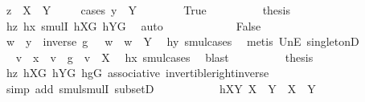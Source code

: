 \begin{isabellebody}
\ {\isachardoublequoteopen}z\ {\isasymin}\ X\ {\isasymcdots}\ Y{\isachardoublequoteclose}\isanewline
\ \ \ \ \isamarkupfalse%
{\isacharparenleft}{\kern0pt}cases\ {\isachardoublequoteopen}y\ {\isasymin}\ Y{\isachardoublequoteclose}{\isacharparenright}{\kern0pt}\isanewline
\ \ \ \ \ \ \isamarkupfalse%
\ True\isanewline
\ \ \ \ \ \ \isamarkupfalse%
\ \isamarkupfalse%
\ {\isacharquery}{\kern0pt}thesis\ \isamarkupfalse%
\ hz\ hx\ smulI\ hXG\ hYG\ \isamarkupfalse%
\ auto\isanewline
\ \ \ \ \isamarkupfalse%
\isanewline
\ \ \ \ \ \ \isamarkupfalse%
\ False\isanewline
\ \ \ \ \ \ \isamarkupfalse%
\ \isamarkupfalse%
\ w\ \ {\isachardoublequoteopen}y\ {\isacharequal}{\kern0pt}\ inverse\ g\ {\isasymcdot}\ \ w{\isachardoublequoteclose}\ \ {\isachardoublequoteopen}w\ {\isasymin}\ Y{\isachardoublequoteclose}\ \isamarkupfalse%
\ hy\ smul{\isachardot}{\kern0pt}cases\ \isamarkupfalse%
\ {\isacharparenleft}{\kern0pt}metis\ UnE\ singletonD{\isacharparenright}{\kern0pt}\isanewline
\ \ \ \ \ \ \isamarkupfalse%
\ \isamarkupfalse%
\ v\ \ {\isachardoublequoteopen}x\ {\isacharequal}{\kern0pt}\ v\ {\isasymcdot}\ g{\isachardoublequoteclose}\ \ {\isachardoublequoteopen}v\ {\isasymin}\ X{\isachardoublequoteclose}\ \isamarkupfalse%
\ hx\ smul{\isachardot}{\kern0pt}cases\ \isamarkupfalse%
\ blast\isanewline
\ \ \ \ \ \ \isamarkupfalse%
\ \isamarkupfalse%
\ {\isacharquery}{\kern0pt}thesis\ \isamarkupfalse%
\ hz\ hXG\ hYG\ hgG\ associative\ invertible{\isacharunderscore}{\kern0pt}right{\isacharunderscore}{\kern0pt}inverse{}\isanewline
\ \ \ \ \ \ \ \ \isamarkupfalse%
\ {\isacharparenleft}{\kern0pt}simp\ add{\isacharcolon}{\kern0pt}\ smul{\isachardot}{\kern0pt}smulI\ subsetD{\isacharparenright}{\kern0pt}\isanewline
\ \ \ \ \isamarkupfalse%
\isanewline
\ \ \isamarkupfalse%
\isanewline
\ \ \isamarkupfalse%
\ hXY{}{\isacharcolon}{\kern0pt}\ {\isachardoublequoteopen}{\isacharquery}{\kern0pt}X{}\ {\isasymcdots}\ {\isacharquery}{\kern0pt}Y{}\ {\isasymsubseteq}\ X\ {\isasymcdots}\ Y{\isachardoublequoteclose}\isanewline
\ \ \isamarkupfalse%
\isanewline
\ \ \ \ \isamarkupfalse%

\end{isabellebody}
